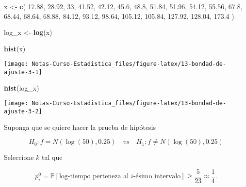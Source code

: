 \documentclass[
  12pt,
]{book}
\newenvironment{Shaded}{\begin{snugshade}}{\end{snugshade}}
\newcommand{\DecValTok}[1]{\textcolor[rgb]{0.00,0.00,0.81}{#1}}
\newcommand{\FloatTok}[1]{\textcolor[rgb]{0.00,0.00,0.81}{#1}}
\newcommand{\KeywordTok}[1]{\textcolor[rgb]{0.13,0.29,0.53}{\textbf{#1}}}
\newcommand{\NormalTok}[1]{#1}
\newcommand{\StringTok}[1]{\textcolor[rgb]{0.31,0.60,0.02}{#1}}
\begin{document}
\begin{Shaded}
\begin{Highlighting}[]
\NormalTok{x \textless{}{-}}\StringTok{ }\KeywordTok{c}\NormalTok{(}
  \FloatTok{17.88}\NormalTok{, }\FloatTok{28.92}\NormalTok{, }\DecValTok{33}\NormalTok{, }\FloatTok{41.52}\NormalTok{, }\FloatTok{42.12}\NormalTok{, }\FloatTok{45.6}\NormalTok{, }\FloatTok{48.8}\NormalTok{, }\FloatTok{51.84}\NormalTok{, }\FloatTok{51.96}\NormalTok{, }\FloatTok{54.12}\NormalTok{, }\FloatTok{55.56}\NormalTok{,}
  \FloatTok{67.8}\NormalTok{, }\FloatTok{68.44}\NormalTok{, }\FloatTok{68.64}\NormalTok{, }\FloatTok{68.88}\NormalTok{, }\FloatTok{84.12}\NormalTok{, }\FloatTok{93.12}\NormalTok{, }\FloatTok{98.64}\NormalTok{, }\FloatTok{105.12}\NormalTok{, }\FloatTok{105.84}\NormalTok{, }\FloatTok{127.92}\NormalTok{,}
  \FloatTok{128.04}\NormalTok{, }\FloatTok{173.4}
\NormalTok{)}

\NormalTok{log\_x \textless{}{-}}\StringTok{ }\KeywordTok{log}\NormalTok{(x)}
\end{Highlighting}
\end{Shaded}

\begin{Shaded}
\begin{Highlighting}[]
\KeywordTok{hist}\NormalTok{(x)}
\end{Highlighting}
\end{Shaded}

\begin{center}\texttt{[image: Notas-Curso-Estadistica\_files/figure-latex/13-bondad-de-ajuste-3-1]} \end{center}

\begin{Shaded}
\begin{Highlighting}[]
\KeywordTok{hist}\NormalTok{(log\_x)}
\end{Highlighting}
\end{Shaded}

\begin{center}\texttt{[image: Notas-Curso-Estadistica\_files/figure-latex/13-bondad-de-ajuste-3-2]} \end{center}

Suponga que se quiere hacer la prueba de hipótesis

\[H_0: f = N(\log(50),0.25) \quad vs \quad H_1: f \neq N(\log(50),0.25)\]

Seleccione \(k\) tal que

\[
p_i^0 = \mathbb P[\text{log-tiempo perteneza al }i\text{-ésimo intervalo}]\geq \dfrac 5{23}\approx \dfrac 14.
\]
\end{document}
